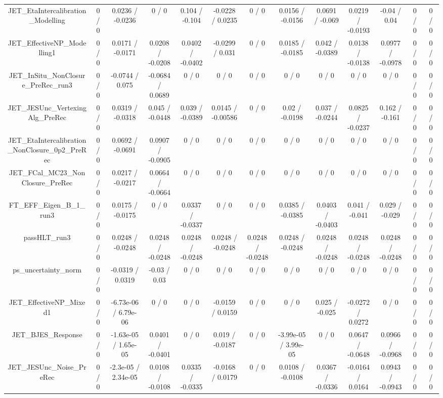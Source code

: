\documentclass[10pt]{article}
\begin{document}
\begin{table}[htbp]
\begin{center}
\begin{tabular}{|c|c|c|c|c|c|c|c|c|c|c|c|c|}
  JET_EtaIntercalibration_Modelling & 0 / 0 & 0.0236 / -0.0236 & 0 / 0 & 0.104 / -0.104 & -0.0228 / 0.0235 & 0 / 0 & 0.0156 / -0.0156 & 0.0691 / -0.069 & 0.0219 / -0.0193 & -0.04 / 0.04 & 0 / 0 & 0 / 0 \\ 
  JET_EffectiveNP_Modelling1 & 0 / 0 & 0.0171 / -0.0171 & 0.0208 / -0.0208 & 0.0402 / -0.0402 & -0.0299 / 0.031 & 0 / 0 & 0.0185 / -0.0185 & 0.042 / -0.0389 & 0.0138 / -0.0138 & 0.0977 / -0.0978 & 0 / 0 & 0 / 0 \\ 
  JET_InSitu_NonClosure_PreRec_run3 & 0 / 0 & -0.0744 / 0.075 & -0.0684 / 0.0689 & 0 / 0 & 0 / 0 & 0 / 0 & 0 / 0 & 0 / 0 & 0 / 0 & 0 / 0 & 0 / 0 & 0 / 0 \\ 
  JET_JESUnc_VertexingAlg_PreRec & 0 / 0 & 0.0319 / -0.0318 & 0.045 / -0.0448 & 0.039 / -0.0389 & 0.0145 / -0.00586 & 0 / 0 & 0.02 / -0.0198 & 0.037 / -0.0244 & 0.0825 / -0.0237 & 0.162 / -0.161 & 0 / 0 & 0 / 0 \\ 
  JET_EtaIntercalibration_NonClosure_0p2_PreRec & 0 / 0 & 0.0692 / -0.0691 & 0.0907 / -0.0905 & 0 / 0 & 0 / 0 & 0 / 0 & 0 / 0 & 0 / 0 & 0 / 0 & 0 / 0 & 0 / 0 & 0 / 0 \\ 
  JET_FCal_MC23_NonClosure_PreRec & 0 / 0 & 0.0217 / -0.0217 & 0.0664 / -0.0664 & 0 / 0 & 0 / 0 & 0 / 0 & 0 / 0 & 0 / 0 & 0 / 0 & 0 / 0 & 0 / 0 & 0 / 0 \\ 
  FT_EFF_Eigen_B_1_run3 & 0 / 0 & 0.0175 / -0.0175 & 0 / 0 & 0.0337 / -0.0337 & 0 / 0 & 0 / 0 & 0.0385 / -0.0385 & 0.0403 / -0.0403 & 0.041 / -0.041 & 0.029 / -0.029 & 0 / 0 & 0 / 0 \\ 
  passHLT_run3 & 0 / 0 & 0.0248 / -0.0248 & 0.0248 / -0.0248 & 0.0248 / -0.0248 & 0.0248 / -0.0248 & 0.0248 / -0.0248 & 0.0248 / -0.0248 & 0.0248 / -0.0248 & 0.0248 / -0.0248 & 0.0248 / -0.0248 & 0 / 0 & 0 / 0 \\ 
  ps_uncertainty_norm & 0 / 0 & -0.0319 / 0.0319 & -0.03 / 0.03 & 0 / 0 & 0 / 0 & 0 / 0 & 0 / 0 & 0 / 0 & 0 / 0 & 0 / 0 & 0 / 0 & 0 / 0 \\ 
  JET_EffectiveNP_Mixed1 & 0 / 0 & -6.73e-06 / 6.79e-06 & 0 / 0 & 0 / 0 & -0.0159 / 0.0159 & 0 / 0 & 0 / 0 & 0.025 / -0.025 & -0.0272 / 0.0272 & 0 / 0 & 0 / 0 & 0 / 0 \\ 
  JET_BJES_Response & 0 / 0 & -1.63e-05 / 1.65e-05 & 0.0401 / -0.0401 & 0 / 0 & 0.019 / -0.0187 & 0 / 0 & -3.99e-05 / 3.99e-05 & 0 / 0 & 0.0647 / -0.0648 & 0.0966 / -0.0968 & 0 / 0 & 0 / 0 \\ 
  JET_JESUnc_Noise_PreRec & 0 / 0 & -2.3e-05 / 2.34e-05 & 0.0108 / -0.0108 & 0.0335 / -0.0335 & -0.0168 / 0.0179 & 0 / 0 & 0.0108 / -0.0108 & 0.0367 / -0.0336 & -0.0164 / 0.0164 & 0.0943 / -0.0943 & 0 / 0 & 0 / 0 \\ 

\end{tabular}
\end{center}
\end{table}
\end{document}
